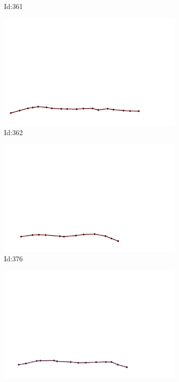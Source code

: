 \documentclass[12pt,twoside]{report}
\begin{document}
\begin{figure}
\begin{subfigure}[b]{0.20\textwidth}
\caption{Id:361}
\end{subfigure}
\begin{subfigure}[b]{0.20\textwidth}
\centering
\includegraphics[width=\textwidth]{../trajectories/362.png}
\caption{Id:362}
\end{subfigure}
\begin{subfigure}[b]{0.20\textwidth}
\centering
\includegraphics[width=\textwidth]{../trajectories/376.png}
\caption{Id:376}
\end{subfigure}
\begin{subfigure}[b]{0.20\textwidth}
\centering
\includegraphics[width=\textwidth]{../trajectories/379.png}

\end{subfigure}
\end{figure}
\end{document}
